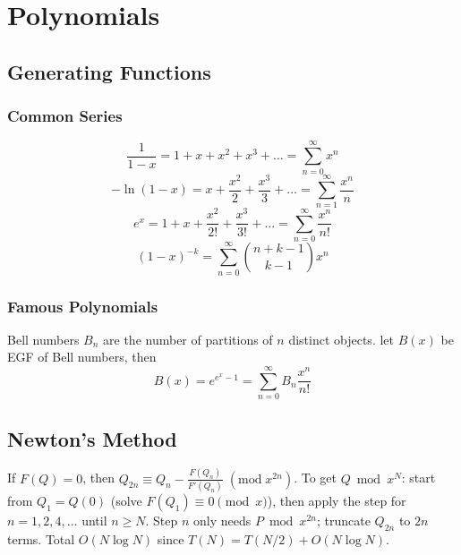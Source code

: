 \chapter{Polynomials}

\section{Generating Functions}
\subsection{Common Series}
\[\frac{1}{1-x} = 1 + x + x^2 + x^3 + \dots = \sum_{n=0}^\infty x^n\]
\[-\ln(1-x) = x + \frac{x^2}{2} + \frac{x^3}{3} + \dots = \sum_{n=1}^\infty \frac{x^n}{n}\]
\[e^x = 1 + x + \frac{x^2}{2!} + \frac{x^3}{3!} + \dots = \sum_{n=0}^\infty \frac{x^n}{n!}\]
\[(1-x)^{-k} = \sum_{n=0}^\infty \binom{n+k-1}{k-1} x^n\]

\subsection{Famous Polynomials}
Bell numbers $B_n$ are the number of partitions of $n$ distinct objects.
let $B(x)$ be EGF of Bell numbers, then
\[B(x) = e^{e^x - 1} = \sum_{n=0}^\infty B_n \frac{x^n}{n!}\]

\section{Newton's Method}
If $F(Q) = 0$, then $Q_{2n} \equiv Q_{n} - \frac{F(Q_{n})}{F'(Q_{n})}\;(\mathrm{mod}\; x^{2n})$.
To get $Q \bmod x^N$: start from $Q_1 = Q(0)$ (solve $F(Q_1) \equiv 0 \pmod x$), then apply the step for $n = 1, 2, 4, \dots$ until $n \ge N$.
Step $n$ only needs $P \bmod x^{2n}$; truncate $Q_{2n}$ to $2n$ terms.
Total $O(N \log N)$ since $T(N) = T(N/2) + O(N \log N)$.

